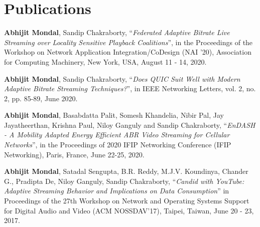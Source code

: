 \section*{Publications}
\begin{enumerate}[start=1,label={[\arabic*]}]
	\item \textbf{Abhijit Mondal}, Sandip Chakraborty, ``\textit{Federated Adaptive Bitrate Live Streaming over Locality Sensitive Playback Coalitions}”, in the Proceedings of the Workshop on Network Application Integration/CoDesign (NAI '20), Association for Computing Machinery, New York, USA, August 11 - 14, 2020. 
	\item \textbf{Abhijit Mondal}, Sandip Chakraborty, ``\textit{Does QUIC Suit Well with Modern Adaptive Bitrate Streaming Techniques?}”, in IEEE Networking Letters, vol. 2, no. 2, pp. 85-89, June 2020.
	\item \textbf{Abhijit Mondal}, Basabdatta Palit, Somesh Khandelia, Nibir Pal, Jay Jayatheerthan, Krishna Paul, Niloy Ganguly and Sandip Chakraborty, ``\textit{EnDASH - A Mobility Adapted Energy Efficient ABR Video Streaming for Cellular Networks}'', in the Proceedings of 2020 IFIP Networking Conference (IFIP Networking), Paris, France, June 22-25, 2020.
	\item \textbf{Abhijit Mondal}, Satadal Sengupta, B.R. Reddy, M.J.V. Koundinya, Chander G., Pradipta De, Niloy Ganguly, Sandip Chakraborty, ``\textit{Candid with YouTube: Adaptive Streaming Behavior and Implications on Data Consumption}'' in Proceedings of the 27th Workshop on Network and Operating Systems Support for Digital Audio and Video (ACM NOSSDAV’17), Taipei, Taiwan, June 20 - 23, 2017.
\end{enumerate}